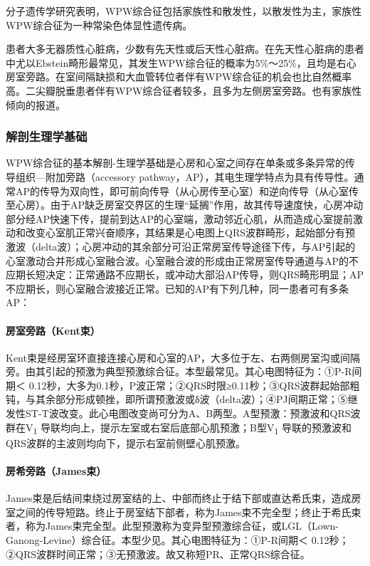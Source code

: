 分子遗传学研究表明，WPW综合征包括家族性和散发性，以散发性为主，家族性WPW综合征为一种常染色体显性遗传病。

患者大多无器质性心脏病，少数有先天性或后天性心脏病。在先天性心脏病的患者中尤以Ebstein畸形最常见，其发生WPW综合征的概率为5\%～25\%，且均是右心房室旁路。在室间隔缺损和大血管转位者伴有WPW综合征的机会也比自然概率高。二尖瓣脱垂患者伴有WPW综合征者较多，且多为左侧房室旁路。也有家族性倾向的报道。

\subsubsection{解剖生理学基础}

WPW综合征的基本解剖-生理学基础是心房和心室之间存在单条或多条异常的传导组织---附加旁路（accessory
pathway，AP），其电生理学特点为具有传导性。通常AP的传导为双向性，即可前向传导（从心房传至心室）和逆向传导（从心室传至心房）。由于AP缺乏房室交界区的生理“延搁”作用，故其传导速度快，心房冲动部分经AP快速下传，提前到达AP的心室端，激动邻近心肌，从而造成心室提前激动和改变心室肌正常兴奋顺序，其结果是心电图上QRS波群畸形，起始部分有预激波（delta波）；心房冲动的其余部分可沿正常房室传导途径下传，与AP引起的心室激动合并形成心室融合波。心室融合波的形成由正常房室传导通道与AP的不应期长短决定：正常通路不应期长，或冲动大部沿AP传导，则QRS畸形明显；AP不应期长，则心室融合波接近正常。已知的AP有下列几种，同一患者可有多条AP：

\paragraph{房室旁路（Kent束）}

Kent束是经房室环直接连接心房和心室的AP，大多位于左、右两侧房室沟或间隔旁。由其引起的预激为典型预激综合征。本型最常见。其心电图特征为：①P-R间期＜
0.12秒，大多为0.1秒，P波正常；②QRS时限≥0.11秒；③QRS波群起始部粗钝，与其余部分形成顿挫，即所谓预激波或δ波（delta波）；④PJ间期正常；⑤继发性ST-T波改变。此心电图改变尚可分为A、B两型。A型预激：预激波和QRS波群在V\textsubscript{1}
导联均向上，提示左室或右室后底部心肌预激；B型V\textsubscript{1}
导联的预激波和QRS波群的主波则均向下，提示右室前侧壁心肌预激。

\paragraph{房希旁路（James束）}

James束是后结间束绕过房室结的上、中部而终止于结下部或直达希氏束，造成房室之间的传导短路。终止于房室结下部者，称为James束不完全型；终止于希氏束者，称为James束完全型。此型预激称为变异型预激综合征，或LGL（Lown-Ganong-Levine）综合征。本型少见。其心电图特征为：①P-R间期＜
0.12秒；②QRS波群时间正常；③无预激波。故又称短PR、正常QRS综合征。

